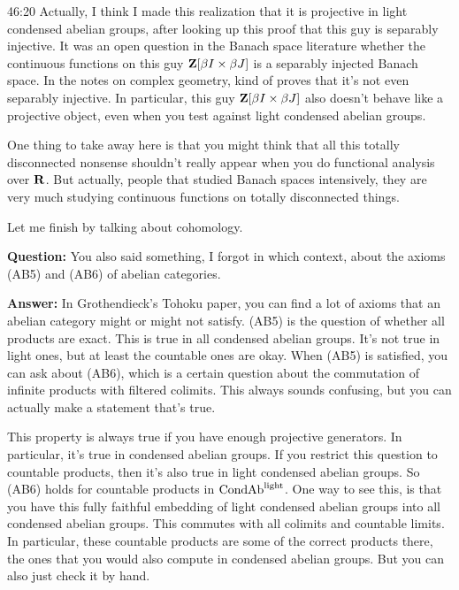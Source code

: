 \begin{unfinished}{46:20}
Actually, I think I made this realization that it is projective in light condensed abelian groups, after looking up this proof that this guy is separably injective. It was an open question in the Banach space literature whether the continuous functions on this guy $\mathbf Z[\beta I \times \beta J]$ is a separably injected Banach space. In the notes on complex geometry,  kind of proves that it's not even separably injective. 
In particular, this guy $\mathbf Z[\beta I \times \beta J]$ also doesn't behave like a projective object, even when you test against light condensed abelian groups.

One thing to take away here is that you might think that all this totally disconnected nonsense shouldn't really appear when you do functional analysis over $\mathbf R$. But actually, people that studied Banach spaces intensively, they are very much studying continuous functions on totally disconnected things.

Let me finish by talking about cohomology. 

\textbf{Question:} You also said something, I forgot in which context, about the axioms (AB5) and (AB6) of abelian categories.

\textbf{Answer:} In Grothendieck's Tohoku paper, you can find a lot of axioms that an abelian category might or might not satisfy. (AB5) is the question of whether all products are exact. This is true in all condensed abelian groups. It's not true in light ones, but at least the countable ones are okay. When (AB5) is satisfied, you can ask about (AB6), which is a certain question about the commutation of infinite products with filtered colimits. This always sounds confusing, but you can actually make a statement that's true.

This property is always true if you have enough projective generators. In particular, it's true in condensed abelian groups. If you restrict this question to countable products, then it's also true in light condensed abelian groups. 
So (AB6) holds for countable products in $\mathrm{Cond}\mathrm{Ab}^{\mathrm{light}}$. One way to see this, is that you have this fully faithful embedding of light condensed abelian groups into all condensed abelian groups. This commutes with all colimits and countable limits. In particular, these countable products are some of the correct products there, the ones that you would also compute in condensed abelian groups. But you can also just check it by hand.


\end{unfinished}
